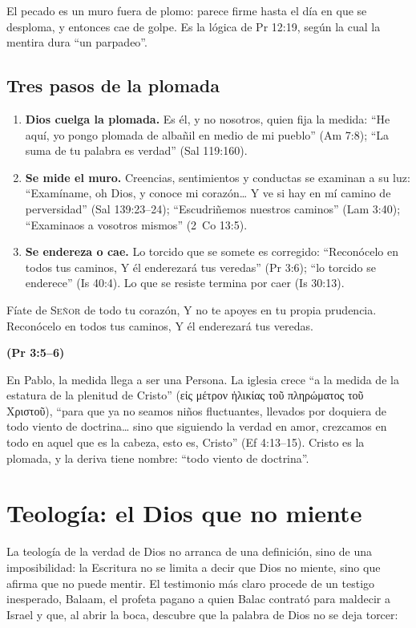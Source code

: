 \documentclass[11pt,letterpaper]{article}
\newcommand{\grc}[1]{\foreignlanguage{ancientgreek}{#1}}
\newcommand{\SENOR}{\textsc{Señor}}
\newcommand{\fuente}[1]{\par\hfill{\upshape\bfseries\small\textcolor{azul}{#1}}}
\begin{document}
El pecado es un muro fuera de plomo: parece firme hasta el día en que se desploma, y entonces cae de golpe. Es la lógica de Pr 12:19, según la cual la mentira dura ``un parpadeo''.

\subsection{Tres pasos de la plomada}
\begin{enumerate}
\item \textbf{Dios cuelga la plomada.} Es él, y no nosotros, quien fija la medida: ``He aquí, yo pongo plomada de albañil en medio de mi pueblo'' (Am 7:8); ``La suma de tu palabra es verdad'' (Sal 119:160).
\item \textbf{Se mide el muro.} Creencias, sentimientos y conductas se examinan a su luz: ``Examíname, oh Dios, y conoce mi corazón\ldots{} Y ve si hay en mí camino de perversidad'' (Sal 139:23--24); ``Escudriñemos nuestros caminos'' (Lam 3:40); ``Examinaos a vosotros mismos'' (2~Co 13:5).
\item \textbf{Se endereza o cae.} Lo torcido que se somete es corregido: ``Reconócelo en todos tus caminos, Y él enderezará tus veredas'' (Pr 3:6); ``lo torcido se enderece'' (Is 40:4). Lo que se resiste termina por caer (Is 30:13).
\end{enumerate}

\begin{cita}Fíate de \SENOR{} de todo tu corazón, Y no te apoyes en tu propia prudencia. Reconócelo en todos tus caminos, Y él enderezará tus veredas.\fuente{(Pr 3:5--6)}\end{cita}

En Pablo, la medida llega a ser una Persona. La iglesia crece ``a la medida de la estatura de la plenitud de Cristo'' (\grc{εἰς μέτρον ἡλικίας τοῦ πληρώματος τοῦ Χριστοῦ}), ``para que ya no seamos niños fluctuantes, llevados por doquiera de todo viento de doctrina\ldots{} sino que siguiendo la verdad en amor, crezcamos en todo en aquel que es la cabeza, esto es, Cristo'' (Ef 4:13--15). Cristo es la plomada, y la deriva tiene nombre: ``todo viento de doctrina''.

\section{Teología: el Dios que no miente}

La teología de la verdad de Dios no arranca de una definición, sino de una imposibilidad: la Escritura no se limita a decir que Dios no miente, sino que afirma que no puede mentir. El testimonio más claro procede de un testigo inesperado, Balaam, el profeta pagano a quien Balac contrató para maldecir a Israel y que, al abrir la boca, descubre que la palabra de Dios no se deja torcer:
\end{document}
